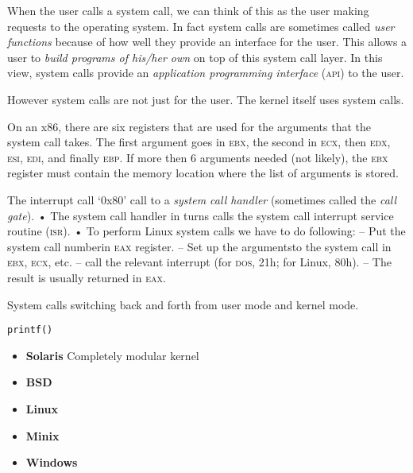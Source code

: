 
When the user calls a system call, we can think of this as the user making 
requests to the operating system. In fact system calls are sometimes called
\textit{user functions} because of how well they provide an interface for the user. 
This allows a user to \textit{build programs of his/her own} on top of this system call layer. 
In this view, system calls provide an \textit{application programming interface} 
(\textsc{api}) 
to the user.


However system calls are not just for the user. The kernel itself 
uses system calls. 

\frmrule

On an x86, there are six registers that are used for the arguments that
the system call takes. The first argument goes in \textsc{ebx}, the
second in \textsc{ecx}, then \textsc{edx}, \textsc{esi}, \textsc{edi}, and 
finally \textsc{ebp}. If
more then 6 arguments needed (not likely), the \textsc{ebx}
register must contain the memory location where the list of arguments is stored.

The interrupt call ‘0x80’ call to a \textit{system call handler} (sometimes
called the \textit{call gate}).
• The system call handler in turns calls the system call interrupt
service routine (\textsc{isr}).
• To perform Linux system calls we have to do following:
– Put the system call numberin \textsc{eax} register.
– Set up the argumentsto the system call in \textsc{ebx}, \textsc{ecx}, etc.
– call the relevant interrupt (for \textsc{dos}, 21h; for Linux,
80h).
– The result is usually returned in \textsc{eax}.



System calls switching back and forth from user mode and kernel mode. 


\begin{example}

\begin{lstlisting}
printf()
\end{lstlisting}
\end{example}





\begin{itemize}   
\renewcommand{\labelitemi}{$\Box$}
\item \textbf{Solaris} 
Completely modular kernel
\item \textbf{BSD} 
\item \textbf{Linux} 
\item \textbf{Minix} 
\item \textbf{Windows} 
\end{itemize}

